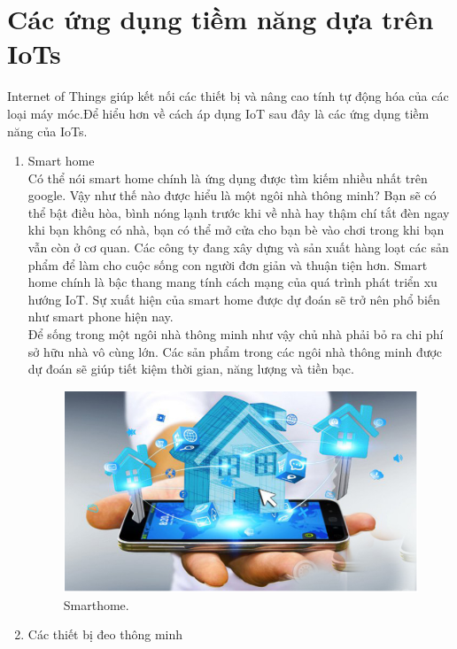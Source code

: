 \section{Các ứng dụng tiềm năng dựa trên IoTs}
Internet of Things giúp kết nối các thiết bị và nâng cao tính tự động hóa của các loại máy móc.Để hiểu hơn về cách áp dụng IoT sau đây là các ứng dụng tiềm năng của IoTs.
\begin{enumerate}
    \item Smart home\\
Có thể nói smart home chính là ứng dụng được tìm kiếm nhiều nhất trên google. Vậy như thế nào được hiểu là một ngôi nhà thông minh? Bạn sẽ có thể bật điều hòa, bình nóng lạnh trước khi về nhà hay thậm chí tắt đèn ngay khi bạn không có nhà, bạn có thể mở cửa cho bạn bè vào chơi trong khi bạn vẫn còn ở cơ quan. Các công ty đang xây dựng và sản xuất hàng loạt các sản phẩm để làm cho cuộc sống con người đơn giản và thuận tiện hơn. Smart home chính là bậc thang mang tính cách mạng của quá trình phát triển xu hướng IoT. Sự xuất hiện của smart home được dự đoán sẽ trở nên phổ biến như smart phone hiện nay.\\
Để sống trong một ngôi nhà thông minh như vậy chủ nhà phải bỏ ra chi phí sở hữu nhà vô cùng lớn. Các sản phẩm trong các ngôi nhà thông minh được dự đoán sẽ giúp tiết kiệm thời gian, năng lượng và tiền bạc.
\begin{center}
    \begin{figure}[htp]
    \begin{center}
     \includegraphics[scale=0.6]{image1/marthome.png}
    \end{center}
    \caption{Smarthome.}
    \label{refhinh1}
    \end{figure}
\end{center}
    \item Các thiết bị đeo thông minh\\

\end{enumerate}
